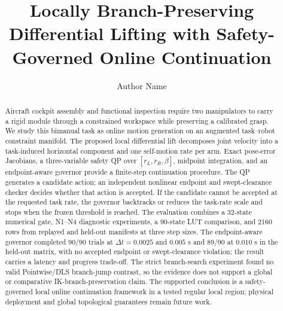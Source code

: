 \documentclass[preprint,12pt]{elsarticle}
\begin{document}
\begin{frontmatter}

\title{Locally Branch-Preserving Differential Lifting with Safety-Governed Online Continuation}

\author[inst1]{Author Name}

\begin{abstract}
Aircraft cockpit assembly and functional inspection require two manipulators to carry a rigid module through a constrained workspace while preserving a calibrated grasp. We study this bimanual task as online motion generation on an augmented task--robot constraint manifold. The proposed local differential lift decomposes joint velocity into a task-induced horizontal component and one self-motion rate per arm. Exact pose-error Jacobians, a three-variable safety QP over $[r_L,r_R,\beta]$, midpoint integration, and an endpoint-aware governor provide a finite-step continuation procedure. The QP generates a candidate action; an independent nonlinear endpoint and swept-clearance checker decides whether that action is accepted. If the candidate cannot be accepted at the requested task rate, the governor backtracks or reduces the task-rate scale and stops when the frozen threshold is reached. The evaluation combines a 32-state numerical gate, N1--N4 diagnostic experiments, a 90-state LUT comparison, and 2160 rows from replayed and held-out manifests at three step sizes. The endpoint-aware governor completed 90/90 trials at $\Delta t=0.0025$ and $0.005$ s and 89/90 at $0.010$ s in the held-out matrix, with no accepted endpoint or swept-clearance violation; the result carries a latency and progress trade-off. The strict branch-search experiment found no valid Pointwise/DLS branch-jump contrast, so the evidence does not support a global or comparative IK-branch-preservation claim. The supported conclusion is a safety-governed local online continuation framework in a tested regular local region; physical deployment and global topological guarantees remain future work.
\end{abstract}


\end{frontmatter}
\end{document}
